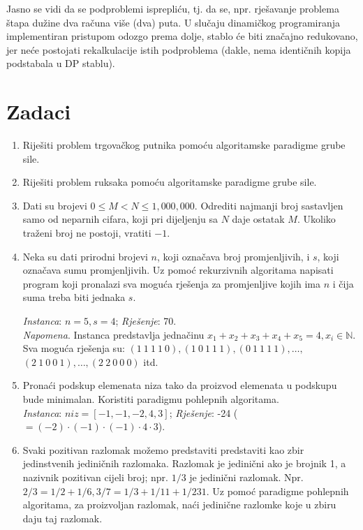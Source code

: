    Jasno se vidi da se podproblemi isprepliću, tj. da se, npr. rješavanje problema štapa dužine dva računa više (dva) puta. U slučaju dinamičkog programiranja implementiran  pristupom odozgo prema dolje, stablo će biti značajno redukovano, jer neće postojati rekalkulacije istih podproblema (dakle, nema identičnih kopija podstabala u DP stablu). 
 

\section{Zadaci}

\begin{enumerate}
	\item Riješiti problem trgovačkog putnika pomoću algoritamske paradigme grube sile.
	\item Riješiti problem ruksaka pomoću algoritamske paradigme grube sile.
	\item Dati  su brojevi  $0 \leq  M  <  N  \leq  1,000,000$. Odrediti  najmanji  broj  sastavljen  samo  od 
	neparnih cifara, koji pri dijeljenju sa $N$ daje ostatak $M$. Ukoliko traženi broj ne postoji, vratiti $−1$. 
	
	 \item Neka su dati prirodni brojevi $n$, koji označava broj promjenljivih, i $s$, koji označava sumu promjenljivih. Uz
pomoć rekurzivnih algoritama napisati program koji pronalazi sva moguća rješenja
za promjenljive  kojih ima $n$ i  čija   suma treba biti jednaka $ s$. 

\textit{Instanca}: $n = 5, s = 4$;
\textit{Rješenje}: 70. \\
\textit{Napomena}.
Instanca predstavlja jednačinu $x_1 + x_2 + x_3 + x_4 + x_5 = 4, x_i \in \mathbb{N}$. 
Sva moguća rješenja su:
$(1\ 1\ 1\ 1\ 0), (1\ 0\ 1\ 1\ 1), (0\ 1\ 1\ 1\ 1), \ldots ,$ $(2\ 1\ 0\ 0\ 1), \ldots , (2\ 2\ 0\ 0\ 0)$ itd.
	\item Pronaći podskup elemenata niza tako da  proizvod elemenata u podskupu bude minimalan. Koristiti paradigmu pohlepnih algoritama.\\
	 \textit{Instanca}: $niz = [ -1, -1, -2, 4, 3]$; \textit{Rješenje}:  -24 ($=(-2 )\cdot (-1) \cdot (-1) \cdot 4 \cdot 3$). 
	
	\item Svaki pozitivan razlomak možemo predstaviti predstaviti kao zbir jedi\-nstvenih jediničnih razlomaka. Razlomak je jedinični ako je brojnik 1, a nazivnik pozitivan cijeli broj; npr. $1/3$ je jedinični razlomak. Npr. $2/3= 1/2 + 1/6, 3/7=1/3 + 1/11 + 1/231.$   Uz pomoć paradigme pohlepnih algoritama, za proizvoljan razlomak, naći jedinične razlomke koje u zbiru daju taj razlomak.  
	

\end{enumerate}
